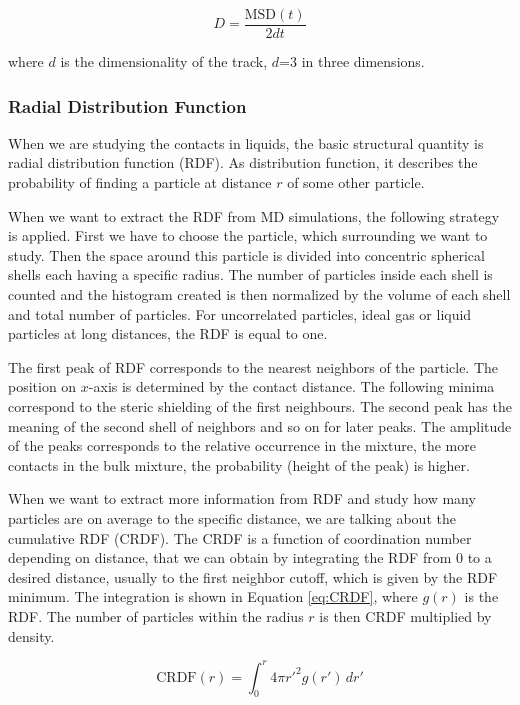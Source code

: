 \begin{equation}\label{eq:Di}
	D = \frac{\text{MSD}(t)}{2dt}
\end{equation}

where $d$ is the dimensionality of the track, $d$=3 in three dimensions.

\subsubsection{Radial Distribution Function}
When we are studying the contacts in liquids, the basic structural quantity is radial distribution function (RDF). As distribution function, it describes the probability of finding a particle at distance $r$ of some other particle. \cite{mdskripta} 

When we want to extract the RDF from MD simulations, the following strategy is applied. First we have to choose the particle, which surrounding we want to study. Then the space around this particle is divided into concentric spherical shells each having a specific radius. The number of particles inside each shell is counted and the histogram created is then normalized by the volume of each shell and total number of particles. For uncorrelated particles, ideal gas or liquid particles at long distances, the RDF is equal to one. 

The first peak of RDF corresponds to the nearest neighbors of the particle. The position on $x$-axis is determined by the contact distance. The following minima correspond to the steric shielding of the first neighbours. The second peak has the meaning of the second shell of neighbors and so on for later peaks. The amplitude of the peaks corresponds to the relative occurrence in the mixture, the more contacts in the bulk mixture, the probability (height of the peak) is higher. \cite{mdskripta}

When we want to extract more information from RDF and study how many particles are on average to the specific distance, we are talking about the cumulative RDF (CRDF). The CRDF is a function of coordination number depending on distance, that we can obtain by integrating the RDF from 0 to a desired distance, usually to the first neighbor cutoff, which is given by the RDF minimum. The integration is shown in Equation \ref{eq:CRDF}, where $g(r)$ is the RDF. The number of particles within the radius $r$ is then CRDF multiplied by density.~\cite{mdskripta}

\begin{equation}\label{eq:CRDF}
	\text{CRDF}(r) = \int_{0}^{r} 4\pi r'^2 g(r') \, dr'
\end{equation}

